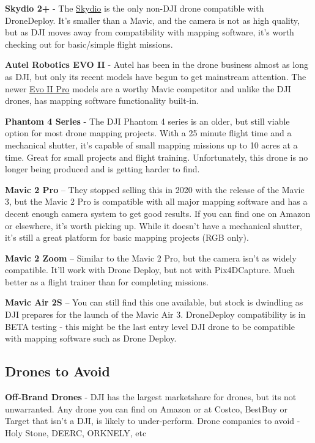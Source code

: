 \documentclass[
  12pt,
]{book}
\begin{document}
\textbf{Skydio 2+} - The \href{https://www.skydio.com/}{Skydio} is the only non-DJI drone compatible with DroneDeploy. It's smaller than a Mavic, and the camera is not as high quality, but as DJI moves away from compatibility with mapping software, it's worth checking out for basic/simple flight missions.

\textbf{Autel Robotics EVO II} - Autel has been in the drone business almost as long as DJI, but only its recent models have begun to get mainstream attention. The newer \href{https://shop.autelrobotics.com/collections/drones-evo-ii-series}{Evo II Pro} models are a worthy Mavic competitor and unlike the DJI drones, has mapping software functionality built-in.

\textbf{Phantom 4 Series} - The DJI Phantom 4 series is an older, but still viable option for most drone mapping projects. With a 25 minute flight time and a mechanical shutter, it's capable of small mapping missions up to 10 acres at a time. Great for small projects and flight training. Unfortunately, this drone is no longer being produced and is getting harder to find.

\textbf{Mavic 2 Pro} -- They stopped selling this in 2020 with the release of the Mavic 3, but the Mavic 2 Pro is compatible with all major mapping software and has a decent enough camera system to get good results. If you can find one on Amazon or elsewhere, it's worth picking up. While it doesn't have a mechanical shutter, it's still a great platform for basic mapping projects (RGB only).

\textbf{Mavic 2 Zoom} -- Similar to the Mavic 2 Pro, but the camera isn't as widely compatible. It'll work with Drone Deploy, but not with Pix4DCapture. Much better as a flight trainer than for completing missions.

\textbf{Mavic Air 2S} -- You can still find this one available, but stock is dwindling as DJI prepares for the launch of the Mavic Air 3. DroneDeploy compatibility is in BETA testing - this might be the last entry level DJI drone to be compatible with mapping software such as Drone Deploy.

\hypertarget{drones-to-avoid}{%
\subsection{Drones to Avoid}\label{drones-to-avoid}}

\textbf{Off-Brand Drones} - DJI has the largest marketshare for drones, but its not unwarranted. Any drone you can find on Amazon or at Costco, BestBuy or Target that isn't a DJI, is likely to under-perform. Drone companies to avoid - Holy Stone, DEERC, ORKNELY, etc
\end{document}
